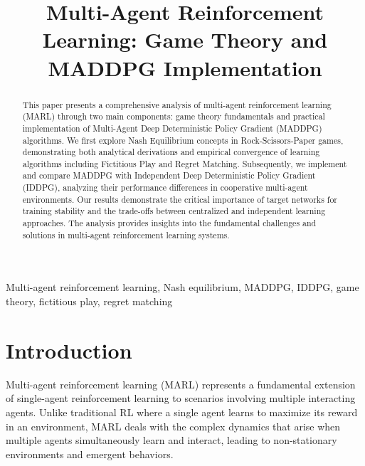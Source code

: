 \documentclass[conference]{IEEEtran}
\begin{document}
\title{Multi-Agent Reinforcement Learning: Game Theory and MADDPG Implementation}

\author{
}

\begin{abstract}
This paper presents a comprehensive analysis of multi-agent reinforcement learning (MARL) through two main components: game theory fundamentals and practical implementation of Multi-Agent Deep Deterministic Policy Gradient (MADDPG) algorithms. We first explore Nash Equilibrium concepts in Rock-Scissors-Paper games, demonstrating both analytical derivations and empirical convergence of learning algorithms including Fictitious Play and Regret Matching. Subsequently, we implement and compare MADDPG with Independent Deep Deterministic Policy Gradient (IDDPG), analyzing their performance differences in cooperative multi-agent environments. Our results demonstrate the critical importance of target networks for training stability and the trade-offs between centralized and independent learning approaches. The analysis provides insights into the fundamental challenges and solutions in multi-agent reinforcement learning systems.
\end{abstract}

\begin{IEEEkeywords}
Multi-agent reinforcement learning, Nash equilibrium, MADDPG, IDDPG, game theory, fictitious play, regret matching
\end{IEEEkeywords}

\maketitle

\section{Introduction}

Multi-agent reinforcement learning (MARL) represents a fundamental extension of single-agent reinforcement learning to scenarios involving multiple interacting agents. Unlike traditional RL where a single agent learns to maximize its reward in an environment, MARL deals with the complex dynamics that arise when multiple agents simultaneously learn and interact, leading to non-stationary environments and emergent behaviors.
\end{document}
